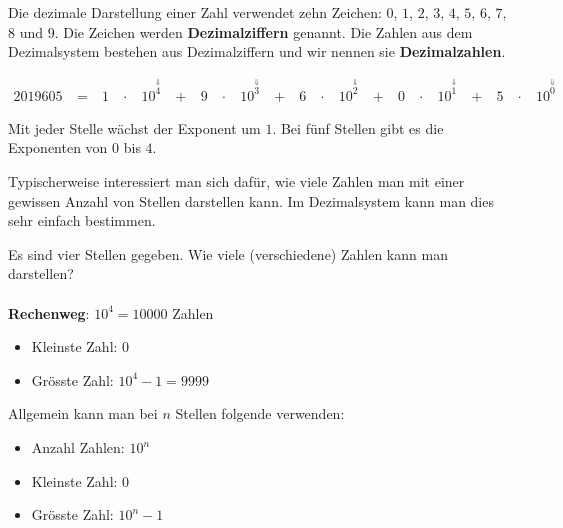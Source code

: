 \begin{definition}[Dezimalzahlen]
Die dezimale Darstellung einer Zahl verwendet zehn Zeichen: $0$, $1$, $2$, $3$, $4$, $5$, $6$, $7$, $8$ und $9$. Die Zeichen werden \textbf{Dezimalziffern} genannt. Die Zahlen aus dem Dezimalsystem bestehen aus Dezimalziffern und wir nennen sie \textbf{Dezimalzahlen}.
\end{definition}

\begin{example}

\begin{alignat*}{20}
19605 & ~ = ~ & 1 & ~\cdot~ & 10^{\overset{\Downarrow}{4}}  & ~ + ~ & 9 & ~\cdot~ & 10^{\overset{\Downarrow}{3}}  & ~ + ~ & 6 & ~\cdot~ & 10^{\overset{\Downarrow}{2}} & ~ + ~ & 0 & ~\cdot~ & 10^{\overset{\Downarrow}{1}} & ~ + ~ & 5 & ~\cdot~ & 10^{\overset{\Downarrow}{0}}
\end{alignat*}

Mit jeder Stelle wächst der Exponent um $1$. Bei fünf Stellen gibt es die Exponenten von $0$ bis $4$.

\end{example}

Typischerweise interessiert man sich dafür, wie viele Zahlen man mit einer gewissen Anzahl von Stellen darstellen kann. Im Dezimalsystem kann man dies sehr einfach bestimmen.

\begin{example}

Es sind vier Stellen gegeben. Wie viele (verschiedene) Zahlen kann man darstellen? \\ \\
\textbf{Rechenweg}: $10^4 = 10000$ Zahlen
\begin{itemize}
\item Kleinste Zahl: $0$
\item Grösste Zahl: $10^4-1=9999$
\end{itemize}

\end{example}

Allgemein kann man bei $n$ Stellen folgende  verwenden:

\begin{itemize}
\item Anzahl Zahlen: $10^n$
\item Kleinste Zahl: $0$
\item Grösste Zahl: $10^n-1$
\end{itemize}